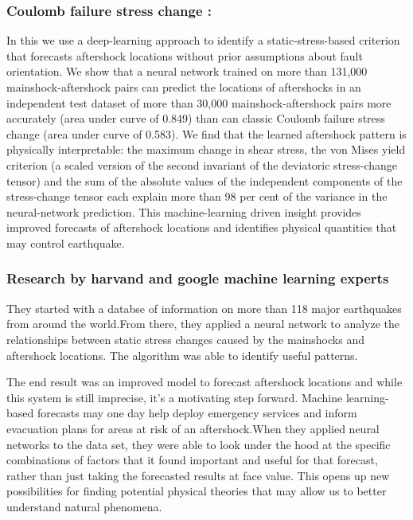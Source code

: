 \documentclass[14pt]{extarticle}
\begin{document}
\subsubsection{Coulomb failure stress change :}
\par In this we  use a deep-learning approach to identify a static-stress-based criterion that forecasts aftershock locations without prior assumptions about fault orientation. We show that a neural network trained on more than 131,000 mainshock-aftershock pairs can predict the locations of aftershocks in an independent test dataset of more than 30,000 mainshock-aftershock pairs more accurately (area under curve of 0.849) than can classic Coulomb failure stress change (area under curve of 0.583). We find that the learned aftershock pattern is physically interpretable: the maximum change in shear stress, the von Mises yield criterion (a scaled version of the second invariant of the deviatoric stress-change tensor) and the sum of the absolute values of the independent components of the stress-change tensor each explain more than 98 per cent of the variance in the neural-network prediction. This machine-learning driven insight provides improved forecasts of aftershock locations and identifies physical quantities that may control earthquake.

\subsubsection{Research by harvand and google machine learning experts}
\par They  started with a databse of information on more than 118 major earthquakes from around the world.From there, they applied a neural network to analyze the relationships between static stress changes caused by the mainshocks and aftershock locations. The algorithm was able to identify useful patterns.
\par The end result was an improved model to forecast aftershock locations and while this system is still imprecise, it's a motivating step forward. Machine learning-based forecasts may one day help deploy emergency services and inform evacuation plans for areas at risk of an aftershock.When they applied neural networks to the data set, they were able to look under the hood at the specific combinations of factors that it found important and useful for that forecast, rather than just taking the forecasted results at face value. This opens up new possibilities for finding potential physical theories that may allow us to better understand natural phenomena.
\end{document}

